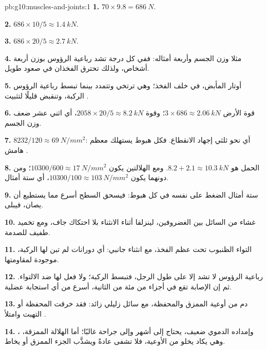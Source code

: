 \begin{solution}{pb:g10:muscles-and-joints:1}
\textbf{1.} $70 \times 9.8 = \qty{686}{N}$.

\textbf{2.} $686 \times 10/5 \approx \qty{1.4}{kN}$.

\textbf{3.} $686 \times 20/5 \approx \qty{2.7}{kN}$.

\textbf{4.} مثلا وزن الجسم وأربعة أمثاله: ففي كل درجة تشد رباعية
الرؤوس بوزن أربعة أشخاص، ولذلك تحترق الفخذان في صعود طويل.

\textbf{5.} أوتار المأبض، في خلف الفخذ؛ وهي ترتخي وتتمدد بينما تبسط
رباعية الرؤوس الركبة، وتنقبض قليلًا لتثبيت .

\textbf{6.} قوة الأرض $3 \times 686 \approx \qty{2.06}{kN}$؛ وقوة
 $2058 \times 20/5 \approx \qty{8.2}{kN}$، أي اثني عشر ضعف وزن
الجسم.

\textbf{7.} $8232/120 \approx \qty{69}{N/mm^2}$: أي نحو ثلثي إجهاد
الانقطاع. فكل هبوط يستهلك معظم هامش .

\textbf{8.} الحمل هو $8.2 + 2.1 \approx \qty{10.3}{kN}$. ومع
الهلالتين يكون $10300/600 \approx \qty{17}{N/mm^2}$؛ ومن دونهما
يكون $10300/100 \approx \qty{103}{N/mm^2}$، أي ستة أمثال.

\textbf{9.} ستة أمثال الضغط على  نفسه في كل هبوط: فيسحق السطح
أسرع مما يستطيع أن يصان، فيبلى.

\textbf{10.} غشاء من السائل بين الغضروفين، لينزلقا أثناء الانثناء بلا
احتكاك جاف، ومع تخميد طفيف للصدمة.

\textbf{11.} التواء الظنبوب تحت عظم الفخذ، مع انثناء جانبي: أي دورانات
لم تبن لها الركبة،  موجودة لمقاومتها.

\textbf{12.} رباعية الرؤوس لا تشد إلا على طول الرجل، فتبسط الركبة؛ ولا
فعل لها ضد الالتواء. ثم إن الإصابة تقع في أجزاء من مئة من الثانية،
أسرع من أي استجابة عضلية.

\textbf{13.} دم من أوعية  الممزق والمحفظة، مع سائل زليلي زائد:
فقد خرقت المحفظة أو التهبت وامتلأ .

\textbf{14.} ، وإمداده الدموي ضعيف، يحتاج إلى أشهر وإلى جراحة
غالبًا؛ أما الهلالة الممزقة، وهي  يكاد يخلو من الأوعية، فلا تشفى
عادةً ويشذَّب الجزء الممزق أو يخاط.


\end{solution}

